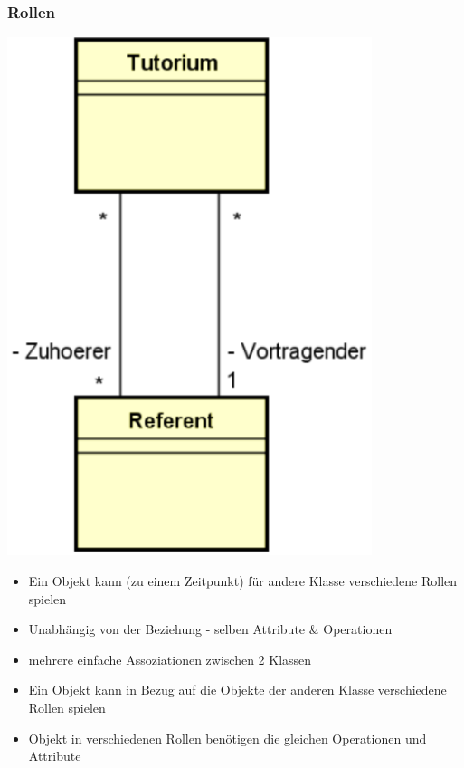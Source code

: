 \documentclass[11pt, a4paper]{article}
\begin{document}
\subsubsection*{Rollen}

\begin{minipage}[h]{0.25\textwidth}
    \centering \includegraphics[width=0.8\textwidth]{Analysemuster-05.png} 
\end{minipage}
\begin{minipage}[h]{0.7\textwidth}
    \raggedleft
    \begin{itemize}
        \item Ein Objekt kann (zu einem Zeitpunkt) für andere Klasse verschiedene Rollen spielen
        \item Unabhängig von der Beziehung - selben Attribute \& Operationen
    \end{itemize}
    \vspace{1em}
    \begin{itemize}
        \item mehrere einfache Assoziationen zwischen 2 Klassen
        \item Ein Objekt kann in Bezug auf die Objekte der anderen Klasse verschiedene Rollen spielen
        \item Objekt in verschiedenen Rollen benötigen die gleichen Operationen und Attribute
    \end{itemize}
\end{minipage}
\end{document}
